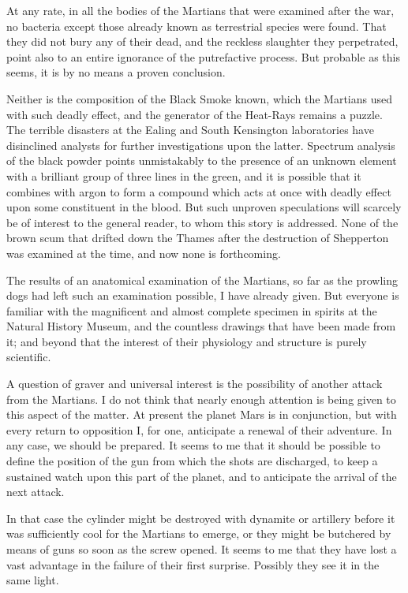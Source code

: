At any rate, in all the bodies of the Martians that were examined
after the war, no bacteria except those already known as
terrestrial species were found. That they did not bury any of their
dead, and the reckless slaughter they perpetrated, point also to an
entire ignorance of the putrefactive process. But probable as this
seems, it is by no means a proven conclusion.

Neither is the composition of the Black Smoke known, which the
Martians used with such deadly effect, and the generator of the
Heat-Rays remains a puzzle. The terrible disasters at the Ealing
and South Kensington laboratories have disinclined analysts for
further investigations upon the latter. Spectrum analysis of the
black powder points unmistakably to the presence of an unknown
element with a brilliant group of three lines in the green, and it
is possible that it combines with argon to form a compound which
acts at once with deadly effect upon some constituent in the blood.
But such unproven speculations will scarcely be of interest to the
general reader, to whom this story is addressed. None of the brown
scum that drifted down the Thames after the destruction of
Shepperton was examined at the time, and now none is forthcoming.

The results of an anatomical examination of the Martians, so far as
the prowling dogs had left such an examination possible, I have
already given. But everyone is familiar with the magnificent and
almost complete specimen in spirits at the Natural History Museum,
and the countless drawings that have been made from it; and beyond
that the interest of their physiology and structure is purely
scientific.

A question of graver and universal interest is the possibility of
another attack from the Martians. I do not think that nearly enough
attention is being given to this aspect of the matter. At present
the planet Mars is in conjunction, but with every return to
opposition I, for one, anticipate a renewal of their adventure. In
any case, we should be prepared. It seems to me that it should be
possible to define the position of the gun from which the shots are
discharged, to keep a sustained watch upon this part of the planet,
and to anticipate the arrival of the next attack.

In that case the cylinder might be destroyed with dynamite or
artillery before it was sufficiently cool for the Martians to
emerge, or they might be butchered by means of guns so soon as the
screw opened. It seems to me that they have lost a vast advantage
in the failure of their first surprise. Possibly they see it in the
same light.


